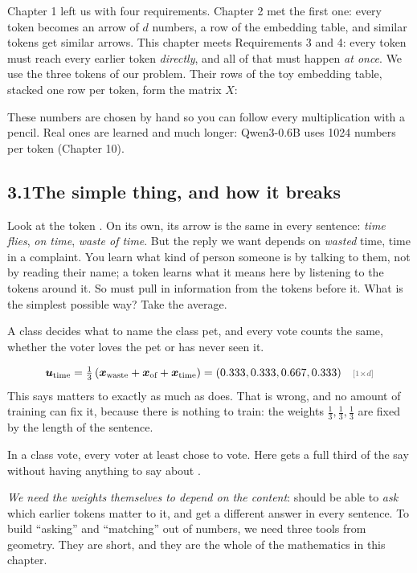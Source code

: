 Chapter 1 left us with four requirements. Chapter 2 met the first one: every token becomes an arrow of $d$
numbers, a row of the embedding table, and similar tokens get similar arrows. This chapter meets Requirements 3
and 4: every token must reach every earlier token \emph{directly}, and all of that must happen \emph{at once}.
We use the three tokens of our problem. Their rows of the toy embedding table, stacked one row per token,
form the matrix $X$:
\begin{center}\end{center}
These numbers are chosen by hand so you can follow every multiplication with a pencil. Real ones are learned
and much longer: Qwen3-0.6B uses 1024 numbers per token (Chapter 10).

\subsection*{3.1\quad The simple thing, and how it breaks}

Look at the token . On its own, its arrow is the same in every sentence: \emph{time flies}, \emph{on
time}, \emph{waste of time}. But the reply we want depends on \emph{wasted} time, time in a complaint. You learn
what kind of person someone is by talking to them, not by reading their name; a token learns what it means here
by listening to the tokens around it. So  must pull in information from the tokens before it. What is
the simplest possible way? Take the average.

\Picture A class decides what to name the class pet, and every vote counts the same, whether the voter loves
the pet or has never seen it.

\Exactly
\[
\bm{u}_{\text{time}} = \tfrac{1}{3}\left(\bm{x}_{\text{waste}} + \bm{x}_{\text{of}} + \bm{x}_{\text{time}}\right) = \uTime \shape{1\times d}
\]
This says  matters to  exactly as much as  does. That is wrong, and no amount of
training can fix it, because there is nothing to train: the weights $\tfrac13,\tfrac13,\tfrac13$ are fixed by
the length of the sentence.

\begin{breaks}
In a class vote, every voter at least chose to vote. Here  gets a full third of the say without having
anything to say about .
\end{breaks}

\Why \emph{We need the weights themselves to depend on the content}:  should be able to \emph{ask}
which earlier tokens matter to it, and get a different answer in every sentence. To build ``asking'' and
``matching'' out of numbers, we need three tools from geometry. They are short, and they are the whole of the
mathematics in this chapter.

